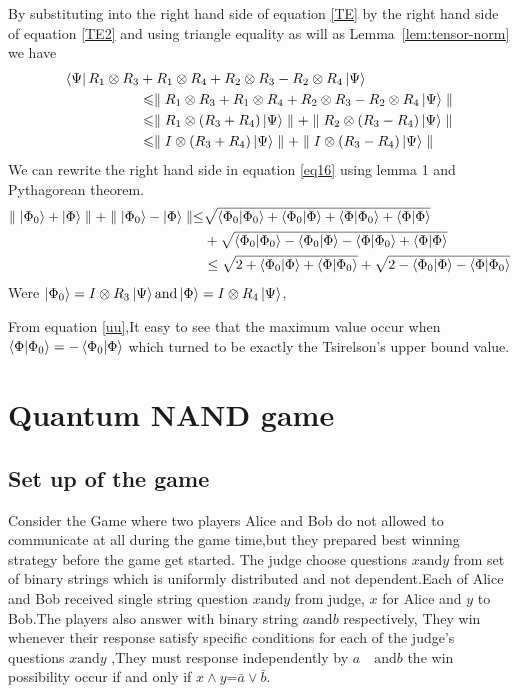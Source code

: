 By substituting into the right hand side of equation \ref{TE} by the right hand side of equation \ref{TE2} and using   triangle equality as will as Lemma~\ref{lem:tensor-norm} we have
\begin{align}
\bra{\Psi}R_1\otimes R_3 &+ R_1\otimes R_4+R_2\otimes R_3 -R_2\otimes R_4\ket{\Psi} \\
&\leqslant  \parallel R_1\otimes R_3+ R_1\otimes R_4+R_2\otimes R_3 -R_2\otimes R_4\ket{\Psi}\parallel \nonumber\\
&\leqslant \parallel R_1\otimes (R_3+ R_4)\ket{\Psi}\parallel +\parallel R_2\otimes( R_3 - R_4)\ket{\Psi}\parallel\nonumber \\
&\leqslant \parallel I\otimes (R_3+ R_4)\ket{\Psi}\parallel +\parallel I\otimes( R_3 - R_4)\ket{\Psi}\parallel\label{eq16}
\end{align}
We can rewrite the right hand side in equation \ref{eq16} using lemma 1 and Pythagorean theorem.
\begin{align}
\parallel \ket{\Phi_0}+ \ket{\Phi}\parallel +\parallel \ket{\Phi_0}- \ket{\Phi}\parallel \leq &\sqrt{\bra{\Phi_0}\ket{\Phi_0}+\bra{\Phi_0}\ket{\Phi}+\bra{\Phi}\ket{\Phi_0}+\bra{\Phi}\ket{\Phi}}\nonumber\\
&+\sqrt{\bra{\Phi_0}\ket{\Phi_0}-\bra{\Phi_0}\ket{\Phi}-\bra{\Phi}\ket{\Phi_0}+\bra{\Phi}\ket{\Phi}}\nonumber\\
 &\leq \sqrt{2+\bra{\Phi_0}\ket{\Phi}+\bra{\Phi}\ket{\Phi_0}}+\sqrt{2-\bra{\Phi_0}\ket{\Phi}-\bra{\Phi}\ket{\Phi_0}}\label{uu}
\end{align}
Were $\ket{\Phi_0}=I\otimes R_3\ket{\Psi} \text{and}\ket{\Phi}=I\otimes R_4\ket{\Psi}$, 

From equation \ref{uu},It easy to see that the  maximum value  occur when $\bra{\Phi}\ket{\Phi_0}=-\bra{\Phi_0}\ket{\Phi}$ which turned to be exactly the Tsirelson’s  upper bound value.

\section{Quantum NAND game}

\subsection{Set up of the game} 
Consider the Game where two players Alice and Bob  do not allowed to  communicate
at all during the game time,but they prepared  best winning strategy  before the game get started\citep{ANDJIGA1988189}. The judge choose  questions $x  \text{and} y$  from set of binary strings which is uniformly  distributed and not dependent.Each of Alice and Bob received single string question $x \text{and} y$ from  judge, $x$ for Alice and $y$ to Bob.The players also answer with binary string  $a \text{and}  b$ respectively, They win whenever their response satisfy specific conditions for each of the judge's questions $x \text{and}  y$ ,They must response independently by  $a \quad \text{and}  b$ the win possibility occur  if and only if $x \wedge y$=$\bar{a}\vee\bar{b}$.
